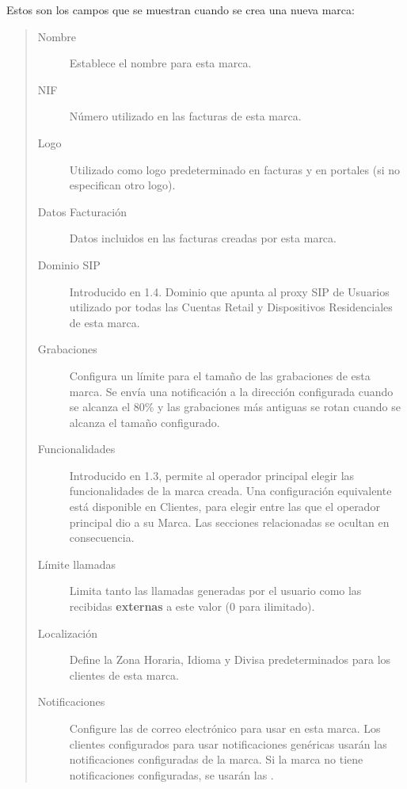 \documentclass[letterpaper,10pt,spanish]{sphinxmanual}
\begin{document}
Estos son los campos que se muestran cuando se crea una nueva marca:
\begin{quote}
\begin{description}
\item[{Nombre}] \leavevmode
Establece el nombre para esta marca.

\item[{NIF}] \leavevmode
Número utilizado en las facturas de esta marca.

\item[{Logo}] \leavevmode
Utilizado como logo predeterminado en facturas y en portales (si no especifican otro logo).

\item[{Datos Facturación}] \leavevmode
Datos incluidos en las facturas creadas por esta marca.

\item[{Dominio SIP}] \leavevmode
Introducido en 1.4. Dominio que apunta al proxy SIP de Usuarios utilizado por todas las Cuentas Retail y Dispositivos Residenciales de esta marca.

\item[{Grabaciones}] \leavevmode
Configura un límite para el tamaño de las grabaciones de esta marca. Se envía una notificación a la dirección configurada cuando se alcanza el 80\% y las grabaciones más antiguas se rotan cuando se alcanza el tamaño configurado.

\item[{Funcionalidades}] \leavevmode
Introducido en 1.3, permite al operador principal elegir las funcionalidades de la marca creada. Una configuración equivalente está disponible en Clientes, para elegir entre las que el operador principal dio a su Marca. Las secciones relacionadas se ocultan en consecuencia.

\item[{Límite llamadas}] \leavevmode
Limita tanto las llamadas generadas por el usuario como las recibidas \textbf{externas} a este valor (0 para ilimitado).

\item[{Localización}] \leavevmode
Define la Zona Horaria, Idioma y Divisa predeterminados para los clientes de esta marca.

\item[{Notificaciones}] \leavevmode
Configure las {\hyperref[administration_portal/brand/settings/notification_templates:id1]{}} de correo electrónico para usar en esta marca. Los clientes configurados para usar notificaciones genéricas usarán las notificaciones configuradas de la marca. Si la marca no tiene notificaciones configuradas, se usarán las {\hyperref[administration_portal/platform/default_notification_templates:id1]{}}.


\end{description}
\end{quote}
\end{document}
